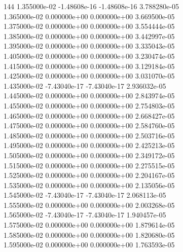 144	1.355000e-02	-1.48608e-16	-1.48608e-16	3.788280e-05	\\ 	1.365000e-02	0.000000e+00	0.000000e+00	3.669500e-05	\\ 	1.375000e-02	0.000000e+00	0.000000e+00	3.554444e-05	\\ 	1.385000e-02	0.000000e+00	0.000000e+00	3.442997e-05	\\ 	1.395000e-02	0.000000e+00	0.000000e+00	3.335043e-05	\\ 	1.405000e-02	0.000000e+00	0.000000e+00	3.230474e-05	\\ 	1.415000e-02	0.000000e+00	0.000000e+00	3.129184e-05	\\ 	1.425000e-02	0.000000e+00	0.000000e+00	3.031070e-05	\\ 	1.435000e-02	-7.43040e-17	-7.43040e-17	2.936032e-05	\\ 	1.445000e-02	0.000000e+00	0.000000e+00	2.843974e-05	\\ 	1.455000e-02	0.000000e+00	0.000000e+00	2.754803e-05	\\ 	1.465000e-02	0.000000e+00	0.000000e+00	2.668427e-05	\\ 	1.475000e-02	0.000000e+00	0.000000e+00	2.584760e-05	\\ 	1.485000e-02	0.000000e+00	0.000000e+00	2.503716e-05	\\ 	1.495000e-02	0.000000e+00	0.000000e+00	2.425213e-05	\\ 	1.505000e-02	0.000000e+00	0.000000e+00	2.349172e-05	\\ 	1.515000e-02	0.000000e+00	0.000000e+00	2.275515e-05	\\ 	1.525000e-02	0.000000e+00	0.000000e+00	2.204167e-05	\\ 	1.535000e-02	0.000000e+00	0.000000e+00	2.135056e-05	\\ 	1.545000e-02	-7.43040e-17	-7.43040e-17	2.068113e-05	\\ 	1.555000e-02	0.000000e+00	0.000000e+00	2.003268e-05	\\ 	1.565000e-02	-7.43040e-17	-7.43040e-17	1.940457e-05	\\ 	1.575000e-02	0.000000e+00	0.000000e+00	1.879614e-05	\\ 	1.585000e-02	0.000000e+00	0.000000e+00	1.820680e-05	\\ 	1.595000e-02	0.000000e+00	0.000000e+00	1.763593e-05	\\ \hline
